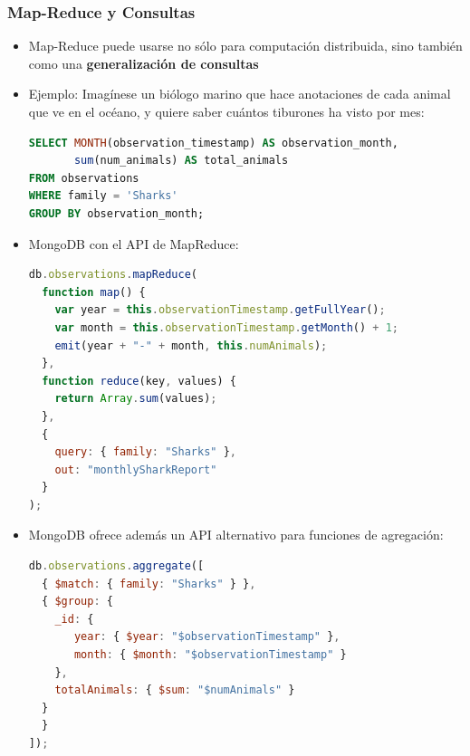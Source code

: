 \documentclass[14pt]{beamer}
\begin{document}
\begin{frame}
  \frametitle{Map-Reduce y Consultas}
\begin{itemize}
\item Map-Reduce puede usarse no sólo para computación distribuida, sino
  también como una {\bf generalización de consultas}
\item Ejemplo: Imagínese un biólogo marino que hace anotaciones de cada
  animal que ve en el océano, y quiere saber cuántos tiburones ha visto por
  mes:
\begin{lstlisting}[language=SQL]
SELECT MONTH(observation_timestamp) AS observation_month,
       sum(num_animals) AS total_animals
FROM observations
WHERE family = 'Sharks'
GROUP BY observation_month;
\end{lstlisting}

  \framebreak

\item MongoDB con el API de MapReduce:
\begin{lstlisting}[language=Javascript,basicstyle=\footnotesize\tt]
db.observations.mapReduce(
  function map() {
    var year = this.observationTimestamp.getFullYear();
    var month = this.observationTimestamp.getMonth() + 1;
    emit(year + "-" + month, this.numAnimals);
  },
  function reduce(key, values) {
    return Array.sum(values);
  },
  {
    query: { family: "Sharks" },
    out: "monthlySharkReport"
  }
);
\end{lstlisting}

\item  MongoDB ofrece además un API alternativo para funciones de agregación:

\begin{lstlisting}[language=Javascript,basicstyle=\footnotesize\tt]
db.observations.aggregate([
  { $match: { family: "Sharks" } },
  { $group: {
    _id: {
       year: { $year: "$observationTimestamp" },
       month: { $month: "$observationTimestamp" }
    },
    totalAnimals: { $sum: "$numAnimals" }
  }
  }
]);
\end{lstlisting}
\end{itemize}
\end{frame}
\end{document}
